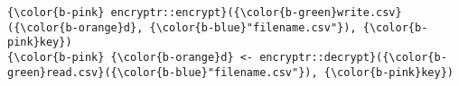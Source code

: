\documentclass[class=minimal,border=0]{standalone}
\begin{document}
%
\begin{BVerbatim}[bgcolor=b-darkgrey]
{\color{b-pink} encryptr::encrypt}({\color{b-green}write.csv}({\color{b-orange}d}, {\color{b-blue}"filename.csv"}), {\color{b-pink}key})
{\color{b-pink} {\color{b-orange}d} <- encryptr::decrypt}({\color{b-green}read.csv}({\color{b-blue}"filename.csv"}), {\color{b-pink}key})
\end{BVerbatim}
\end{document}
